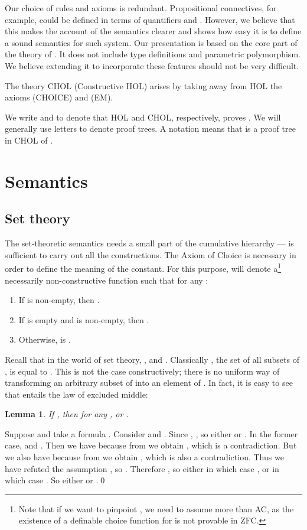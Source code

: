 \documentclass{LMCS}
\newtheorem{lemma}[thm]{Lemma}
\begin{document}
Our choice of rules and axioms is redundant. Propositional connectives,
for example, could be defined in terms of quantifiers and . 
However, we believe that this makes the account of the semantics clearer and
shows how easy it is to define a sound semantics for such system. Our
presentation is based on the core part of the theory of \cite{GM93}. It does
not include type definitions and parametric polymorphism. We believe extending it to
incorporate these features should not be very difficult. 

The theory CHOL (Constructive HOL) arises by taking away from HOL the axioms
(CHOICE) and (EM).

We write  and  to denote that HOL and CHOL,
respectively, proves . We will generally use letters  to denote
proof trees. A notation  means that  is a proof tree in CHOL
of . 

\section{Semantics}\label{semantics}

\subsection{Set theory}

The set-theoretic semantics needs a small part of the cumulative hierarchy ---  is
sufficient to carry out all the constructions. The Axiom of Choice is necessary
in order to define the meaning of the  constant. For this
purpose,  will denote a\footnote{Note that if we want to pinpoint , we need to assume more than AC, as the
existence of a definable choice function for  is not
provable in ZFC.} necessarily non-constructive function such that for any :
\begin{enumerate}[]
\item If  is non-empty, then .
\item If  is empty and  is non-empty, then . 
\item Otherwise,  is . 
\end{enumerate}

Recall that in the world of set theory, ,  and .
Classically , the set of all subsets of , is equal to . This is not the case constructively; there is no
uniform way of transforming an arbitrary subset of  into an element
of . In fact, it is easy to see that  entails the law of excluded
middle:
\begin{lemma}
If , then for any ,  or .
\end{lemma}
\proof
Suppose  and take a formula . Consider  and . Since , ,
so either  or . In the former case, 
and . Then we have  because from  we obtain , which is a contradiction. But we also have  because from  we obtain , which is also a contradiction. Thus we have refuted the assumption , so . Therefore , so either  in which case , or  in which case . So either  or
.\qed
\end{document}
